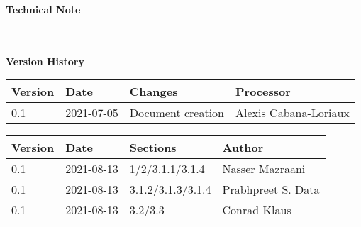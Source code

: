 
\begin{titlepage}
  \begin{center}
    \textbf{\huge{Technical Note}\\\hspace{0pt}}
    
    \ \\
    \ \\
    \textbf{Version History\\\hspace{0pt}}
    
    \begin{tabular*}{\textwidth}
      {%
        @{}p{}
        p{}
        p{}
        p{}@{}
      }
      \toprule
      Version & Date & Changes & Processor \\
      \midrule
      0.1 & 2021-07-05 & Document creation  & Alexis Cabana-Loriaux \\
      \bottomrule
    \end{tabular*}%
    \vspace{1cm}
    \begin{tabular*}{\textwidth}
      {%
        @{}p{}
        p{}
        p{}
        p{}@{}
      }
      \toprule
      Version & Date & Sections & Author \\
      \midrule
      0.1 & 2021-08-13 & 1/2/3.1.1/3.1.4  & Nasser Mazraani \\
      \midrule
      0.1 & 2021-08-13 & 3.1.2/3.1.3/3.1.4  & Prabhpreet S. Data \\
       \midrule
      0.1 & 2021-08-13 & 3.2/3.3  & Conrad Klaus \\
      \bottomrule
    \end{tabular*}%
    
    \vfill
    
    \thispagestyle{TUB}
    
    \pagebreak
    
     
    
    
    
    
  \vfill

     \end{center}%
  \thispagestyle{TUB}%
\end{titlepage}

